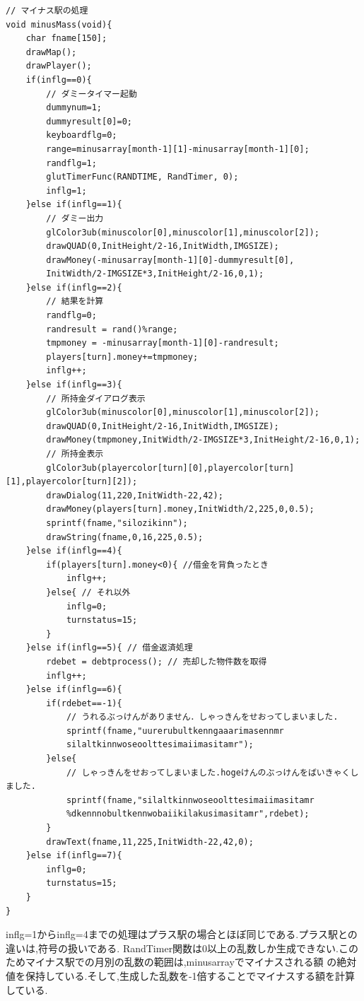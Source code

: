 \documentclass[a4j]{jarticle}
\begin{document}
\begin{lstlisting}[basicstyle=\ttfamily\footnotesize, frame=single,label=minusMass,caption=minusMass関数]
// マイナス駅の処理
void minusMass(void){
    char fname[150];
    drawMap();
    drawPlayer(); 
    if(inflg==0){
        // ダミータイマー起動
        dummynum=1;
        dummyresult[0]=0;
        keyboardflg=0;
        range=minusarray[month-1][1]-minusarray[month-1][0];
        randflg=1;
        glutTimerFunc(RANDTIME, RandTimer, 0);
        inflg=1;            
    }else if(inflg==1){
        // ダミー出力
        glColor3ub(minuscolor[0],minuscolor[1],minuscolor[2]);
        drawQUAD(0,InitHeight/2-16,InitWidth,IMGSIZE);
        drawMoney(-minusarray[month-1][0]-dummyresult[0],
        InitWidth/2-IMGSIZE*3,InitHeight/2-16,0,1);            
    }else if(inflg==2){
        // 結果を計算
        randflg=0;
        randresult = rand()%range;
        tmpmoney = -minusarray[month-1][0]-randresult;
        players[turn].money+=tmpmoney;
        inflg++;
    }else if(inflg==3){
        // 所持金ダイアログ表示
        glColor3ub(minuscolor[0],minuscolor[1],minuscolor[2]);
        drawQUAD(0,InitHeight/2-16,InitWidth,IMGSIZE);
        drawMoney(tmpmoney,InitWidth/2-IMGSIZE*3,InitHeight/2-16,0,1);
        // 所持金表示
        glColor3ub(playercolor[turn][0],playercolor[turn][1],playercolor[turn][2]);
        drawDialog(11,220,InitWidth-22,42);
        drawMoney(players[turn].money,InitWidth/2,225,0,0.5);
        sprintf(fname,"silozikinn");
        drawString(fname,0,16,225,0.5);               
    }else if(inflg==4){
        if(players[turn].money<0){ //借金を背負ったとき
            inflg++;
        }else{ // それ以外
            inflg=0;
            turnstatus=15;
        }
    }else if(inflg==5){ // 借金返済処理
        rdebet = debtprocess(); // 売却した物件数を取得
        inflg++;
    }else if(inflg==6){
        if(rdebet==-1){
            // うれるぶっけんがありません．しゃっきんをせおってしまいました.
            sprintf(fname,"uurerubultkenngaaarimasennmr
            silaltkinnwoseoolttesimaiimasitamr");
        }else{
            // しゃっきんをせおってしまいました.hogeけんのぶっけんをばいきゃくしました.
            sprintf(fname,"silaltkinnwoseoolttesimaiimasitamr
            %dkennnobultkennwobaiikilakusimasitamr",rdebet);
        }
        drawText(fname,11,225,InitWidth-22,42,0); 
    }else if(inflg==7){
        inflg=0;
        turnstatus=15;
    }
}
        \end{lstlisting}
        inflg=1からinflg=4までの処理はプラス駅の場合とほぼ同じである.プラス駅との違いは,符号の扱いである.
        RandTimer関数は0以上の乱数しか生成できない.このためマイナス駅での月別の乱数の範囲は,minusarrayでマイナスされる額
        の絶対値を保持している.そして,生成した乱数を-1倍することでマイナスする額を計算している.\\
\end{document}
